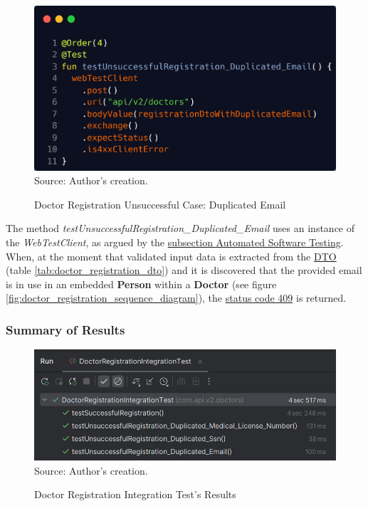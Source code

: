 \begin{figure}[H]
	\centering
	\caption{Doctor Registration Unsuccessful Case: Duplicated Email}
	\includegraphics[width=1\linewidth]{figures/doctor_registration_unsucessful_integration_test_duplicated_email.png}
	\\ \footnotesize Source: Author's creation.
	\label{fig:doctor_registration_unsucessful_integration_test_duplicated_email}
\end{figure}

The method \textit{testUnsuccessfulRegistration\_Duplicated\_Email} uses an instance of the \textit{WebTestClient}, as argued by the \hyperref[subsection:automated_software_testing]{subsection Automated Software Testing}. When, at the moment that validated input data is extracted from the \hyperref[appendix:glossary]{DTO} (table \ref{tab:doctor_registration_dto}) and it is discovered that the provided email is in use in an embedded \textbf{Person} within a \textbf{Doctor} (see figure \ref{fig:doctor_registration_sequence_diagram}), the \hyperref[tab:summary_http_status_codes]{status code 409} is returned.


\subsubsection{Summary of Results}

\begin{figure}[H]
	\centering
	\caption{Doctor Registration Integration Test's Results}
	\includegraphics[width=1\linewidth]{figures/results_doctor_registration_integration_test.png}
	\\ \footnotesize Source: Author's creation.
	\label{fig:results_doctor_registration_integration_test}
\end{figure}


